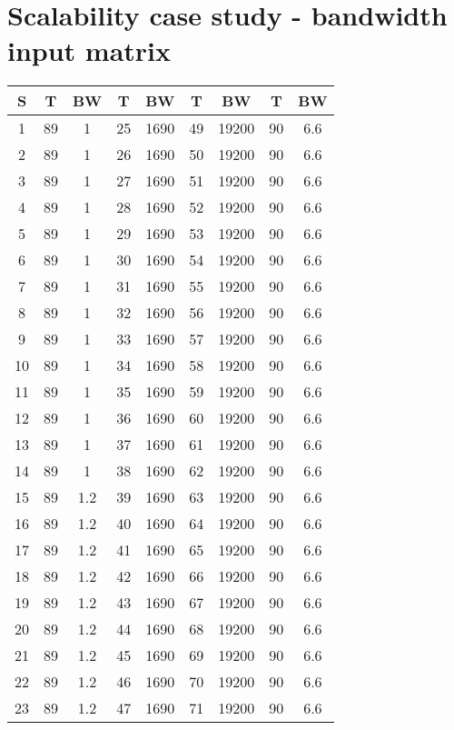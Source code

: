 \clearpage
\section{Scalability case study - bandwidth input matrix}
\label{apdx:validbw}

\begin{center}
\begin{footnotesize}
\begin{tabular}{|c|cccccccc|}
\hline
S & T & BW & T & BW & T & BW & T & BW\\
\hline
1 & 89 & 1 & 25 & 1690 & 49 & 19200 & 90 & 6.6 \\
2 & 89 & 1 & 26 & 1690 & 50 & 19200 & 90 & 6.6 \\
3 & 89 & 1 & 27 & 1690 & 51 & 19200 & 90 & 6.6 \\
4 & 89 & 1 & 28 & 1690 & 52 & 19200 & 90 & 6.6 \\
5 & 89 & 1 & 29 & 1690 & 53 & 19200 & 90 & 6.6 \\
6 & 89 & 1 & 30 & 1690 & 54 & 19200 & 90 & 6.6 \\
7 & 89 & 1 & 31 & 1690 & 55 & 19200 & 90 & 6.6 \\
8 & 89 & 1 & 32 & 1690 & 56 & 19200 & 90 & 6.6 \\
9 & 89 & 1 & 33 & 1690 & 57 & 19200 & 90 & 6.6 \\
10 & 89 & 1 & 34 & 1690 & 58 & 19200 & 90 & 6.6 \\
11 & 89 & 1 & 35 & 1690 & 59 & 19200 & 90 & 6.6 \\
12 & 89 & 1 & 36 & 1690 & 60 & 19200 & 90 & 6.6 \\
13 & 89 & 1 & 37 & 1690 & 61 & 19200 & 90 & 6.6 \\
14 & 89 & 1 & 38 & 1690 & 62 & 19200 & 90 & 6.6 \\
15 & 89 & 1.2 & 39 & 1690 & 63 & 19200 & 90 & 6.6 \\
16 & 89 & 1.2 & 40 & 1690 & 64 & 19200 & 90 & 6.6 \\
17 & 89 & 1.2 & 41 & 1690 & 65 & 19200 & 90 & 6.6 \\
18 & 89 & 1.2 & 42 & 1690 & 66 & 19200 & 90 & 6.6 \\
19 & 89 & 1.2 & 43 & 1690 & 67 & 19200 & 90 & 6.6 \\
20 & 89 & 1.2 & 44 & 1690 & 68 & 19200 & 90 & 6.6 \\
21 & 89 & 1.2 & 45 & 1690 & 69 & 19200 & 90 & 6.6 \\
22 & 89 & 1.2 & 46 & 1690 & 70 & 19200 & 90 & 6.6 \\
23 & 89 & 1.2 & 47 & 1690 & 71 & 19200 & 90 & 6.6 \\

\end{tabular}
\end{footnotesize}
\end{center}
